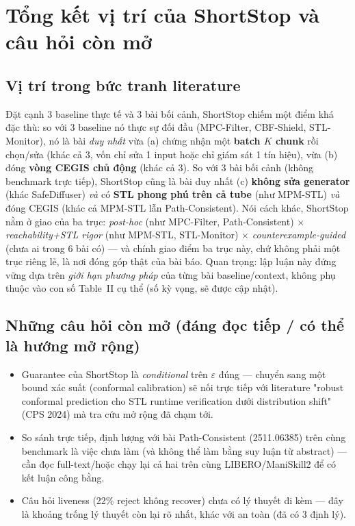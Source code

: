 \documentclass[a4paper,12pt]{article}
\let\stdsection\section
\renewcommand{\section}{\clearpage\stdsection}
\begin{document}
\section{Tổng kết vị trí của ShortStop và câu hỏi còn mở}\label{sec:conclusion}
\subsection{Vị trí trong bức tranh literature}
Đặt cạnh 3 baseline thực tế và 3 bài bối cảnh, ShortStop chiếm một điểm khá đặc thù: so với 3 baseline nó thực sự đối đầu (MPC-Filter, CBF-Shield, STL-Monitor), nó là bài \emph{duy nhất} vừa (a) chứng nhận một \textbf{batch $K$ chunk} rồi chọn/sửa (khác cả 3, vốn chỉ sửa 1 input hoặc chỉ giám sát 1 tín hiệu), vừa (b) đóng \textbf{vòng CEGIS chủ động} (khác cả 3). So với 3 bài bối cảnh (không benchmark trực tiếp), ShortStop cũng là bài duy nhất (c) \textbf{không sửa generator} (khác SafeDiffuser) \emph{và} có \textbf{STL phong phú trên cả tube} (như MPM-STL) \emph{và} đóng CEGIS (khác cả MPM-STL lẫn Path-Consistent). Nói cách khác, ShortStop nằm ở giao của ba trục: \emph{post-hoc} (như MPC-Filter, Path-Consistent) $\times$ \emph{reachability+STL rigor} (như MPM-STL, STL-Monitor) $\times$ \emph{counterexample-guided} (chưa ai trong 6 bài có) — và chính giao điểm ba trục này, chứ không phải một trục riêng lẻ, là nơi đóng góp thật của bài báo. Quan trọng: lập luận này đứng vững dựa trên \emph{giới hạn phương pháp} của từng bài baseline/context, không phụ thuộc vào con số Table~II cụ thể (số kỳ vọng, sẽ được cập nhật).

\subsection{Những câu hỏi còn mở (đáng đọc tiếp / có thể là hướng mở rộng)}
\begin{itemize}
  \item Guarantee của ShortStop là \emph{conditional} trên $\varepsilon$ đúng — chuyển sang một bound xác suất (conformal calibration) sẽ nối trực tiếp với literature "robust conformal prediction cho STL runtime verification dưới distribution shift" (CPS 2024) mà tra cứu mở rộng đã chạm tới.
  \item So sánh trực tiếp, định lượng với bài Path-Consistent (2511.06385) trên cùng benchmark là việc chưa làm (và không thể làm bằng suy luận từ abstract) — cần đọc full-text/hoặc chạy lại cả hai trên cùng LIBERO/ManiSkill2 để có kết luận công bằng.
  \item Câu hỏi liveness (22\% reject không recover) chưa có lý thuyết đi kèm — đây là khoảng trống lý thuyết còn lại rõ nhất, khác với an toàn (đã có 3 định lý).
\end{itemize}
\end{document}
